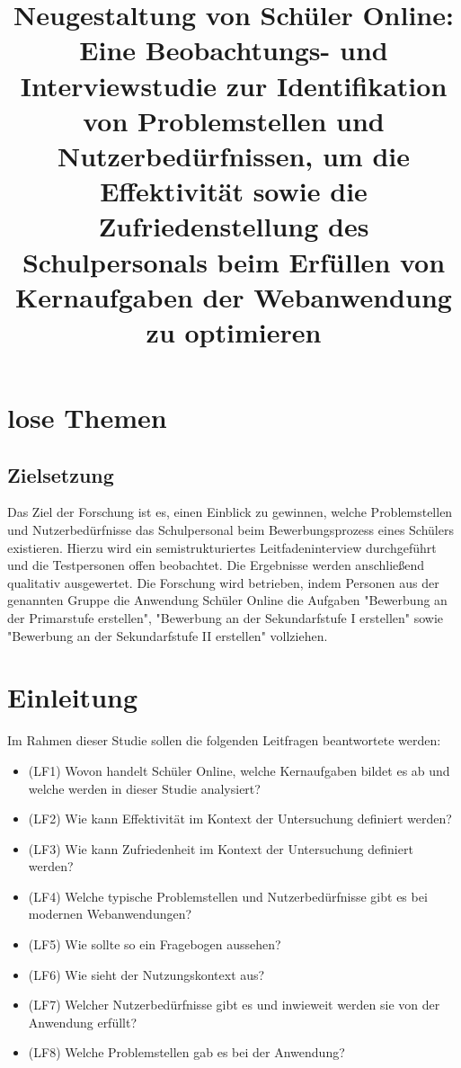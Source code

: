 \section{lose Themen}
\subsection{Zielsetzung}
Das Ziel der Forschung ist es, einen Einblick zu gewinnen, welche Problemstellen und Nutzerbedürfnisse das Schulpersonal beim Bewerbungsprozess eines Schülers existieren. Hierzu wird ein semistrukturiertes Leitfadeninterview durchgeführt und die Testpersonen offen beobachtet. Die Ergebnisse werden anschließend qualitativ ausgewertet. Die Forschung wird betrieben, indem Personen aus der genannten Gruppe die Anwendung Schüler Online die Aufgaben "Bewerbung an der Primarstufe erstellen", "Bewerbung an der Sekundarfstufe I erstellen" sowie "Bewerbung an der Sekundarfstufe II erstellen" vollziehen. 


\title{Neugestaltung von Schüler Online: Eine Beobachtungs- und Interviewstudie zur Identifikation von Problemstellen und Nutzerbedürfnissen, um die Effektivität sowie die Zufriedenstellung des Schulpersonals beim Erfüllen von Kernaufgaben der Webanwendung zu optimieren}

\section{Einleitung}
Im Rahmen dieser Studie sollen die folgenden Leitfragen beantwortete werden: 
\begin{itemize}
    \item (LF1) Wovon handelt Schüler Online, welche Kernaufgaben bildet es ab und welche werden in dieser Studie analysiert? %
    \item (LF2) Wie kann Effektivität im Kontext der Untersuchung definiert werden? %
    \item (LF3) Wie kann Zufriedenheit im Kontext der Untersuchung definiert werden? %
    \item (LF4) Welche typische Problemstellen und Nutzerbedürfnisse gibt es bei modernen Webanwendungen? %
    \item (LF5) Wie sollte so ein Fragebogen aussehen? %
    \item (LF6) Wie sieht der Nutzungskontext aus? %
    \item (LF7) Welcher Nutzerbedürfnisse gibt es und inwieweit werden sie von der Anwendung erfüllt? %
    \item (LF8) Welche Problemstellen gab es bei der Anwendung? %
\end{itemize}




